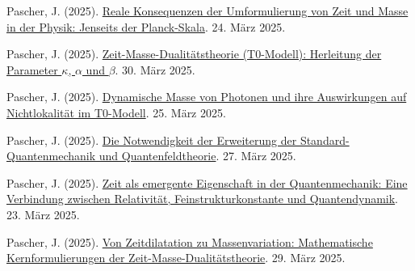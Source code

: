 \documentclass[a4paper,12pt]{article}
\begin{document}
	\begin{thebibliography}{99}
		
		 Pascher, J. (2025). \href{https://github.com/jpascher/T0-Time-Mass-Duality/tree/main/2/pdf/Deutsch/Jenseits%20der%20Planck-Skala.pdf}{Reale Konsequenzen der Umformulierung von Zeit und Masse in der Physik: Jenseits der Planck-Skala}. 24. März 2025.
		
		 Pascher, J. (2025). \href{https://github.com/jpascher/T0-Time-Mass-Duality/tree/main/2/pdf/Deutsch/Zeit-Masse-Dualit%C3%A4tstheorie%20(T0-Modell)%20Herleitung%20der%20Parameter%20kappa,%20alpha%20und%20beta.pdf}{Zeit-Masse-Dualitätstheorie (T0-Modell): Herleitung der Parameter \(\kappa\), \(\alpha\) und \(\beta\)}. 30. März 2025.
		
		 Pascher, J. (2025). \href{https://github.com/jpascher/T0-Time-Mass-Duality/tree/main/2/pdf/Deutsch/Dynamische%20Masse%20von%20Photonen%20und%20ihre%20Implikationen%20f%C3%BCr%20Nichtlokalit%C3%A4t.pdf}{Dynamische Masse von Photonen und ihre Auswirkungen auf Nichtlokalität im T0-Modell}. 25. März 2025.
		
		 Pascher, J. (2025). \href{https://github.com/jpascher/T0-Time-Mass-Duality/tree/main/2/pdf/Deutsch/Die%20Notwendigkeit%20einer%20Erweiterung%20der%20Standard-Quantenmechanik%20und%20Quantenfeldtheorie.pdf}{Die Notwendigkeit der Erweiterung der Standard-Quantenmechanik und Quantenfeldtheorie}. 27. März 2025.
		
		 Pascher, J. (2025). \href{https://github.com/jpascher/T0-Time-Mass-Duality/tree/main/2/pdf/Deutsch/Zeit%20als%20emergente%20Eigenschaft%20in%20der%20Quantenmechanik.pdf}{Zeit als emergente Eigenschaft in der Quantenmechanik: Eine Verbindung zwischen Relativität, Feinstrukturkonstante und Quantendynamik}. 23. März 2025.
		
		 Pascher, J. (2025). \href{https://github.com/jpascher/T0-Time-Mass-Duality/tree/main/2/pdf/Deutsch/Mathematische%20Formulierungen%20der%20Zeit-Masse-Dualit%C3%A4tstheorie%20mit%20Lagrange.pdf}{Von Zeitdilatation zu Massenvariation: Mathematische Kernformulierungen der Zeit-Masse-Dualitätstheorie}. 29. März 2025.

		
	\end{thebibliography}
	
\end{document}
